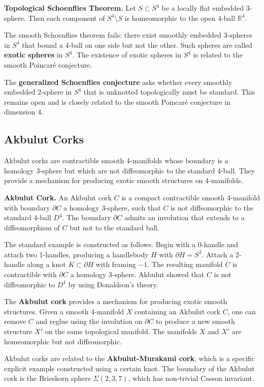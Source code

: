 \textbf{Topological Schoenflies Theorem.} Let $S \subset S^4$ be a locally flat embedded 3-sphere. Then each component of $S^4 \setminus S$ is homeomorphic to the open 4-ball $\mathbb{R}^4$.

The smooth Schoenflies theorem fails: there exist smoothly embedded 3-spheres in $S^4$ that bound a 4-ball on one side but not the other. Such spheres are called \textbf{exotic spheres} in $S^4$. The existence of exotic spheres in $S^4$ is related to the smooth Poincar\'e conjecture.

The \textbf{generalized Schoenflies conjecture} asks whether every smoothly embedded 2-sphere in $S^4$ that is unknotted topologically must be standard. This remains open and is closely related to the smooth Poincar\'e conjecture in dimension 4.

\subsection*{Akbulut Corks}

Akbulut corks are contractible smooth 4-manifolds whose boundary is a homology 3-sphere but which are not diffeomorphic to the standard 4-ball. They provide a mechanism for producing exotic smooth structures on 4-manifolds.

\textbf{Akbulut Cork.} An Akbulut cork $C$ is a compact contractible smooth 4-manifold with boundary $\partial C$ a homology 3-sphere, such that $C$ is not diffeomorphic to the standard 4-ball $D^4$. The boundary $\partial C$ admits an involution that extends to a diffeomorphism of $C$ but not to the standard ball.

The standard example is constructed as follows. Begin with a 0-handle and attach two 1-handles, producing a handlebody $H$ with $\partial H = S^3$. Attach a 2-handle along a knot $K \subset \partial H$ with framing $-1$. The resulting manifold $C$ is contractible with $\partial C$ a homology 3-sphere. Akbulut showed that $C$ is not diffeomorphic to $D^4$ by using Donaldson's theory.

The \textbf{Akbulut cork} provides a mechanism for producing exotic smooth structures. Given a smooth 4-manifold $X$ containing an Akbulut cork $C$, one can remove $C$ and reglue using the involution on $\partial C$ to produce a new smooth structure $X'$ on the same topological manifold. The manifolds $X$ and $X'$ are homeomorphic but not diffeomorphic.

Akbulut corks are related to the \textbf{Akbulut-Murakami cork}, which is a specific explicit example constructed using a certain knot. The boundary of the Akbulut cork is the Brieskorn sphere $\Sigma(2,3,7)$, which has non-trivial Casson invariant.

